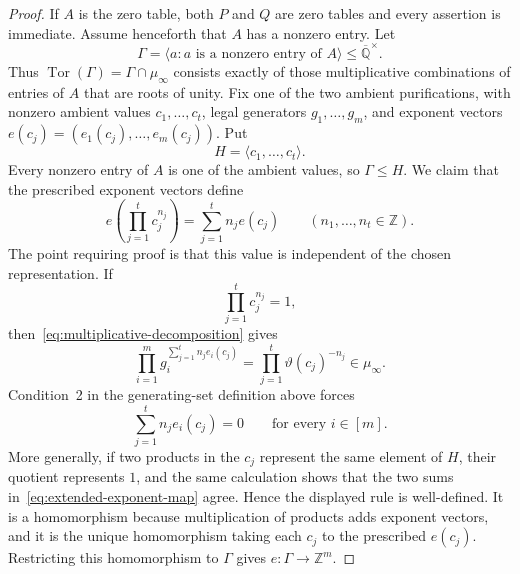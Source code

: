 \documentclass[11pt]{article}
\theoremstyle{plain}
\theoremstyle{definition}
\theoremstyle{remark}
\newcommand{\AlgNums}{\overline{\mathbb Q}}
\DeclareMathOperator{\Tor}{Tor}
\begin{document}
\begin{proof}
If $A$ is the zero table, both $P$ and $Q$ are zero tables and every assertion
is immediate.  Assume henceforth that $A$ has a nonzero entry.
Let
\[
  \Gamma=\langle a:a\text{ is a nonzero entry of }A\rangle
  \le\AlgNums^\times.
\]
Thus $\Tor(\Gamma)=\Gamma\cap\mu_\infty$ consists exactly of those
multiplicative combinations of entries of $A$ that are roots of unity.
Fix one of the two ambient purifications, with
nonzero ambient values $c_1,\ldots,c_t$, legal generators
$g_1,\ldots,g_m$, and exponent vectors
$e(c_j)=(e_1(c_j),\ldots,e_m(c_j))$.  Put
\[
  H=\langle c_1,\ldots,c_t\rangle.
\]
Every nonzero entry of $A$ is one of the ambient values, so $\Gamma\le H$.
We claim that the prescribed exponent vectors define
\begin{equation}
  e\left(\prod_{j=1}^t c_j^{n_j}\right)
  =\sum_{j=1}^t n_j e(c_j)
  \qquad(n_1,\ldots,n_t\in\mathbb Z).
  \label{eq:extended-exponent-map}
\end{equation}
The point requiring proof is that this value is independent of the chosen
representation.  If
\[
  \prod_{j=1}^t c_j^{n_j}=1,
\]
then~\eqref{eq:multiplicative-decomposition} gives
\begin{equation}
  \prod_{i=1}^m
       g_i^{\sum_{j=1}^t n_j e_i(c_j)}
  =\prod_{j=1}^t\vartheta(c_j)^{-n_j}\in\mu_\infty.
  \label{eq:ambient-exponent-relation}
\end{equation}
Condition~2 in the generating-set definition above forces
\[
  \sum_{j=1}^t n_j e_i(c_j)=0
  \qquad\text{for every }i\in[m].
\]
More generally, if two products in the $c_j$ represent the same element of
$H$, their quotient represents $1$, and the same calculation shows that the
two sums in~\eqref{eq:extended-exponent-map} agree.  Hence the displayed rule
is well-defined.  It is a homomorphism because multiplication of products
adds exponent vectors, and it is the unique homomorphism taking each $c_j$
to the prescribed $e(c_j)$.  Restricting this homomorphism to $\Gamma$ gives
$e:\Gamma\to\mathbb Z^m$.


\end{proof}
\end{document}
